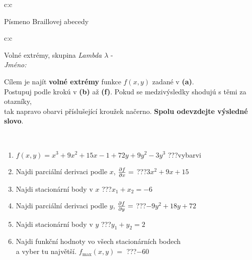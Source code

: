 \documentclass[10pt]{report}
\begin{document}
\begin{tabular}{c:c}
\begin{minipage}[c][104.5mm][t]{0.5\linewidth}
\begin{center}
\begin{minipage}{0.20\linewidth}
\begin{center}
{\small Písmeno Braillovej abecedy}
\end{center}
\end{minipage}
\end{center}
\end{minipage}
%
\end{tabular}
\newpage
\thispagestyle{empty}
\begin{tabular}{c:c}
\begin{minipage}[c][104.5mm][t]{0.5\linewidth}
\begin{center}
\vspace{7mm}
{\huge Volné extrémy, skupina \textit{Lambda $\lambda$} -}\\[5mm]
\textit{Jméno:}\phantom{xxxxxxxxxxxxxxxxxxxxxxxxxxxxxxxxxxxxxxxxxxxxxxxxxxxxxxxxxxxxxxxxx}\\[5mm]
\begin{minipage}{0.95\linewidth}
\begin{center}
Cílem je najít \textbf{volné extrémy} funkce $f(x,y)$ zadané v \textbf{(a)}.\\Postupuj podle krokú v \textbf{(b)} až \textbf{(f)}. Pokud se medzivýsledky shodujú s těmi za otazníky,\\tak napravo obarvi příslušející kroužek načerno. \textbf{Spolu odevzdejte výsledné slovo}.
\end{center}
\end{minipage}
\\[1mm]
\begin{minipage}{0.79\linewidth}
\begin{center}
\begin{varwidth}{\linewidth}
\begin{enumerate}
\normalsize
\item $f(x,y)=x^3+9x^2+15x-1+72y+9y^2-3y^3$\quad \dotfill\; ???\;\dotfill \quad vybarvi
\item Najdi parciální derivaci podle $x$, $\pdv{f}{x}=$\quad \dotfill\; ???\;\dotfill \quad $3x^2+9x+15$
\item Najdi stacionární body v $x$\quad \dotfill\; ???\;\dotfill \quad $x_1+x_2=-6$
\item Najdi parciální derivaci podle $y$, $\pdv{f}{y}=$\quad \dotfill\; ???\;\dotfill \quad $-9y^2+18y+72$
\item Najdi stacionární body v $y$\quad \dotfill\; ???\;\dotfill \quad $y_1+y_2=2$
\item Najdi funkční hodnoty vo všech stacionárních bodech \\ \phantom{xxxxxx} a vyber tu najvětší. $f_{\text{max}}(x,y)=$\quad \dotfill\; ???\;\dotfill \quad $-60$

\end{enumerate}
\end{varwidth}
\end{center}
\end{minipage}
\end{center}
\end{minipage}
\end{tabular}
\end{document}

